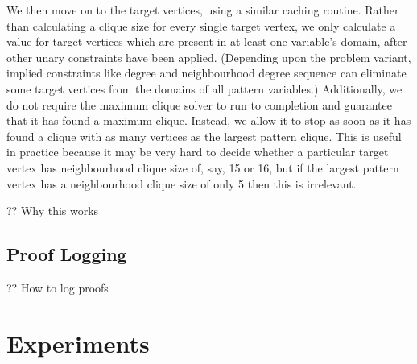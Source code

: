 \documentclass{article}
\begin{document}
We then move on to the target vertices, using a similar caching routine. Rather than calculating a
clique size for every single target vertex, we only calculate a value for target vertices which are
present in at least one variable's domain, after other unary constraints have been applied.
(Depending upon the problem variant, implied constraints like degree and neighbourhood degree
sequence can eliminate some target vertices from the domains of all pattern variables.)
Additionally, we do not require the maximum clique solver to run to completion and guarantee that it
has found a maximum clique. Instead, we allow it to stop as soon as it has found a clique with as
many vertices as the largest pattern clique. This is useful in practice because it may be very hard
to decide whether a particular target vertex has neighbourhood clique size of, say, 15 or 16, but if
the largest pattern vertex has a neighbourhood clique size of only 5 then this is irrelevant.

?? Why this works

\subsection{Proof Logging}

?? How to log proofs

\section{Experiments}
\end{document}

